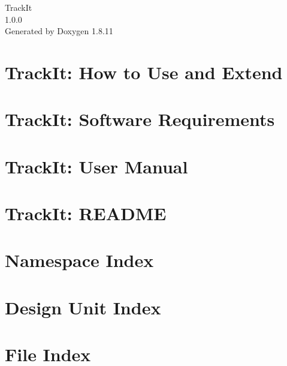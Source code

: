\documentclass[twoside]{book}
\newcommand{\+}{\discretionary{\mbox{\scriptsize$\hookleftarrow$}}{}{}}
\newcommand{\clearemptydoublepage}{%
  \newpage{\pagestyle{empty}\cleardoublepage}%
}
\begin{document}
\hypersetup{pageanchor=false,
             bookmarksnumbered=true,
             pdfencoding=unicode
            }
\begin{titlepage}
\vspace*{7cm}
\begin{center}%
{\Large Track\+It \\[1ex]\large 1.\+0.\+0 }\\
\vspace*{1cm}
{\large Generated by Doxygen 1.8.11}\\
\end{center}
\end{titlepage}
\clearemptydoublepage
\tableofcontents
\clearemptydoublepage
{}
\hypersetup{pageanchor=true}

\chapter{Track\+It\+: How to Use and Extend}
\label{index}\hypertarget{index}{}
\chapter{Track\+It\+: Software Requirements}
\label{md_requirements}
\hypertarget{md_requirements}{}

\chapter{Track\+It\+: User Manual}
\label{md_usermanual}
\hypertarget{md_usermanual}{}

\chapter{Track\+It\+: R\+E\+A\+D\+ME}
\label{md__Users_plato2000_Developer_trackit_README}
\hypertarget{md__Users_plato2000_Developer_trackit_README}{}

\chapter{Namespace Index}

\chapter{Design Unit Index}

\chapter{File Index}

\end{document}
